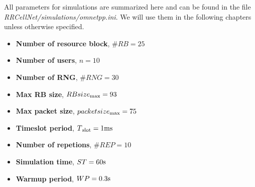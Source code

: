 All parameters for simulations are summarized here and can be found in the file \textit{RRCellNet/simulations/omnetpp.ini}. We will use them in the following chapters unless otherwise specified.
\begin{itemize}
\item \textbf{Number of resource block}, \(\#RB = 25\)
\item \textbf{Number of users}, \(n = 10\)
\item \textbf{Number of RNG}, \(\#RNG = 30\)
\item \textbf{Max RB size}, \(RBsize\textsubscript{max} = 93\)
\item \textbf{Max packet size}, \(packetsize\textsubscript{max} = 75\)
\item \textbf{Timeslot period}, \(T\textsubscript{slot} = 1\textnormal{ms}\)
\item \textbf{Number of repetions}, \(\#REP = 10\)
\item \textbf{Simulation time}, \(ST = 60 \textnormal{s}\)
\item \textbf{Warmup period}, \(WP = 0.3 \textnormal{s}\)
\end{itemize}
